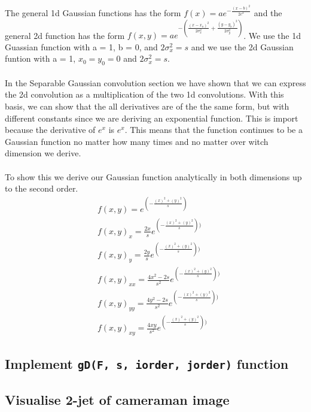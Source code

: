 \documentclass[abstract=true]{scrartcl}
\begin{document}
    The general 1d Gaussian functions has the form 
    $ f(x) = a e^{- { \frac{(x-b)^2 }{ 2 c^2} } } $ 
    and the general 2d function has the form 
    $ f(x,y) = a e^{- \left(\frac{(x-x_o)^2}{2\sigma_x^2} + \frac{(y-y_o)^2}{2\sigma_y^2} \right)} $. 
    We use the 1d Guassian function with a = 1, b = 0, and $ 2\sigma_x^2 = s $ and
    we use the 2d Gaussian funtion with a = 1, $ x_0 = y_0 = 0 $ and $ 2\sigma_x^2 = s $.\\
    \\
    In the Separable Gaussian convolution section we have shown that we can express the
    2d convolution as a multiplication of the two 1d convolutions. With this 
    basis, we can show that the all derivatives are of the the 
    same form, but with different constants since we are deriving an exponential
    function. This is import because the derivative of $e^x$ is $e^x$. This 
    means that the function continues to be a Gaussian function no matter how
    many times and no matter over witch dimension we derive. \\
    \\
    To show this we derive our Gaussian function analytically in both dimensions 
    up to the second order.\\
    \begin{align*}
    &f(x,y)   =  e^{ (-\frac{(x)^2 +(y)^2}{s})} \\
    &f(x,y)_x =  \frac{2x}{s} e^{ (-\frac{(x)^2 +(y)^2}{s}))} \\
    &f(x,y)_y = \frac{2y}{s} e^{ ( -\frac{(x)^2 +(y)^2}{s}))} \\
    &f(x,y)_{xx} =  \frac{4x^2-2s}{s^2} e^{ (-\frac{(x)^2 +(y)^2}{s}))} \\
    &f(x,y)_{yy} =  \frac{4y^2-2s}{s^2} e^{ (-\frac{(x)^2 +(y)^2}{s}))} \\
    &f(x,y)_{xy} =  \frac{4xy}{s^2} e^{ (-\frac{(x)^2 +(y)^2}{s}))}
    \end{align*}
    
    

    \subsection{Implement \texttt{gD(F, s, iorder, jorder)} function}

    \subsection{Visualise 2-jet of cameraman image}
\end{document}
